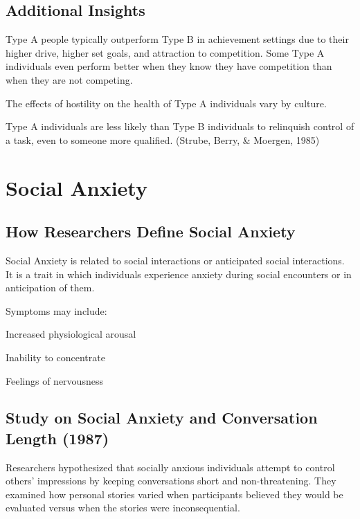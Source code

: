\subsection{Additional Insights}  
\begin{coloredlist}  
    \item Type A people typically outperform Type B in achievement settings due to their higher drive, higher set goals, and attraction to competition. Some Type A individuals even perform better when they know they have competition than when they are not competing.  
    \item The effects of hostility on the health of Type A individuals vary by culture.  
    \item Type A individuals are less likely than Type B individuals to relinquish control of a task, even to someone more qualified. (Strube, Berry, \& Moergen, 1985)  
\end{coloredlist}  

\section{Social Anxiety}  
\subsection{How Researchers Define Social Anxiety}  
Social Anxiety is related to social interactions or anticipated social interactions. It is a trait in which individuals experience anxiety during social encounters or in anticipation of them.  

Symptoms may include:  
\begin{coloredlist}  
    \item Increased physiological arousal  
    \item Inability to concentrate  
    \item Feelings of nervousness  
\end{coloredlist}  

\subsection{Study on Social Anxiety and Conversation Length (1987)}  
Researchers hypothesized that socially anxious individuals attempt to control others' impressions by keeping conversations short and non-threatening. They examined how personal stories varied when participants believed they would be evaluated versus when the stories were inconsequential.  

